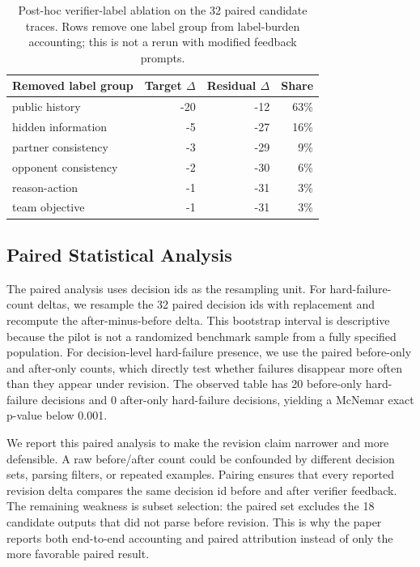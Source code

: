 \documentclass[sigconf,anonymous,review]{acmart}
\begin{document}
\begin{table}[t]
\centering
\caption{Post-hoc verifier-label ablation on the 32 paired candidate traces. Rows remove one label group from label-burden accounting; this is not a rerun with modified feedback prompts.}
\label{tab:label-ablation}
\scriptsize
\begin{tabular}{lrrr}
\toprule
Removed label group & Target \(\Delta\) & Residual \(\Delta\) & Share \\
\midrule
public history & -20 & -12 & 63\% \\
hidden information & -5 & -27 & 16\% \\
partner consistency & -3 & -29 & 9\% \\
opponent consistency & -2 & -30 & 6\% \\
reason-action & -1 & -31 & 3\% \\
team objective & -1 & -31 & 3\% \\
\bottomrule
\end{tabular}
\end{table}

\subsection{Paired Statistical Analysis}

The paired analysis uses decision ids as the resampling unit. For hard-failure-count deltas, we resample the 32 paired decision ids with replacement and recompute the after-minus-before delta. This bootstrap interval is descriptive because the pilot is not a randomized benchmark sample from a fully specified population. For decision-level hard-failure presence, we use the paired before-only and after-only counts, which directly test whether failures disappear more often than they appear under revision. The observed table has 20 before-only hard-failure decisions and 0 after-only hard-failure decisions, yielding a McNemar exact p-value below 0.001.

We report this paired analysis to make the revision claim narrower and more defensible. A raw before/after count could be confounded by different decision sets, parsing filters, or repeated examples. Pairing ensures that every reported revision delta compares the same decision id before and after verifier feedback. The remaining weakness is subset selection: the paired set excludes the 18 candidate outputs that did not parse before revision. This is why the paper reports both end-to-end accounting and paired attribution instead of only the more favorable paired result.
\end{document}
